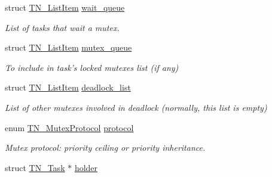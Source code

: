 \begin{DoxyCompactItemize}
\item 
\hypertarget{structTN__Mutex_a65bc07cade239063ba47a140a7d46a92}{struct \hyperlink{structTN__ListItem}{T\+N\+\_\+\+List\+Item} \hyperlink{structTN__Mutex_a65bc07cade239063ba47a140a7d46a92}{wait\+\_\+queue}}\label{structTN__Mutex_a65bc07cade239063ba47a140a7d46a92}

\begin{DoxyCompactList}\small\item\em List of tasks that wait a mutex. \end{DoxyCompactList}\item 
\hypertarget{structTN__Mutex_a3d9a36e9441d047a4ec04878cf4ca2fd}{struct \hyperlink{structTN__ListItem}{T\+N\+\_\+\+List\+Item} \hyperlink{structTN__Mutex_a3d9a36e9441d047a4ec04878cf4ca2fd}{mutex\+\_\+queue}}\label{structTN__Mutex_a3d9a36e9441d047a4ec04878cf4ca2fd}

\begin{DoxyCompactList}\small\item\em To include in task's locked mutexes list (if any) \end{DoxyCompactList}\item 
\hypertarget{structTN__Mutex_afd61f3a49d4c2538a6784e2202893e47}{struct \hyperlink{structTN__ListItem}{T\+N\+\_\+\+List\+Item} \hyperlink{structTN__Mutex_afd61f3a49d4c2538a6784e2202893e47}{deadlock\+\_\+list}}\label{structTN__Mutex_afd61f3a49d4c2538a6784e2202893e47}

\begin{DoxyCompactList}\small\item\em List of other mutexes involved in deadlock (normally, this list is empty) \end{DoxyCompactList}\item 
\hypertarget{structTN__Mutex_a94cb6bc95a05bfd95c0a088c56712bab}{enum \hyperlink{tn__mutex_8h_a11357f7bb31a3b380cbe94e0913a5b40}{T\+N\+\_\+\+Mutex\+Protocol} \hyperlink{structTN__Mutex_a94cb6bc95a05bfd95c0a088c56712bab}{protocol}}\label{structTN__Mutex_a94cb6bc95a05bfd95c0a088c56712bab}

\begin{DoxyCompactList}\small\item\em Mutex protocol\+: priority ceiling or priority inheritance. \end{DoxyCompactList}\item 
\hypertarget{structTN__Mutex_ae182682fa0d571716d03ce13e667254c}{struct \hyperlink{structTN__Task}{T\+N\+\_\+\+Task} $\ast$ \hyperlink{structTN__Mutex_ae182682fa0d571716d03ce13e667254c}{holder}}\label{structTN__Mutex_ae182682fa0d571716d03ce13e667254c}


\end{DoxyCompactItemize}
